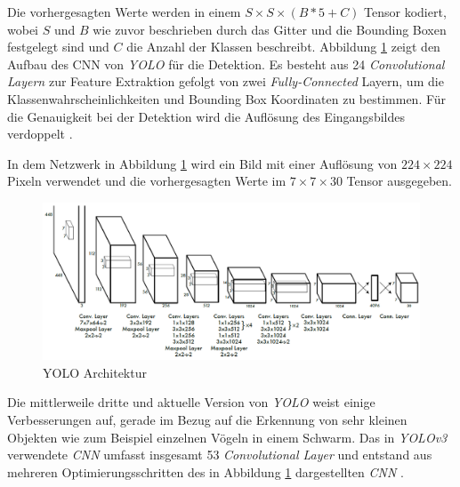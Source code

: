 Die vorhergesagten Werte werden in einem $S \times S \times (B * 5 + C)$ Tensor kodiert, wobei $S$ und $B$ wie zuvor beschrieben durch das Gitter und die Bounding Boxen festgelegt sind und $C$ die Anzahl der Klassen beschreibt. Abbildung \ref{yolo_architecture} zeigt den Aufbau des CNN von \textit{YOLO} für die Detektion. Es besteht aus 24 \textit{Convolutional Layern} zur Feature Extraktion gefolgt von zwei \textit{Fully-Connected} Layern, um die Klassenwahrscheinlichkeiten und Bounding Box Koordinaten zu bestimmen. Für die Genauigkeit bei der Detektion wird die Auflösung des Eingangsbildes verdoppelt \cite{JosephRedmon.2016}. 

In dem Netzwerk in Abbildung \ref{yolo_architecture} wird ein Bild mit einer Auflösung von $224 \times 224$ Pixeln verwendet und die vorhergesagten Werte im $7 \times 7 \times 30$ Tensor ausgegeben.

\begin{figure}[ht]
	\begin{center}
		\includegraphics[width=15cm]{Bilder/yolo_architecture.png} 
		\caption[YOLO Architektur]{YOLO Architektur \cite{JosephRedmon.2016}}
		\label{yolo_architecture}
	\end{center}
\end{figure}

Die mittlerweile dritte und aktuelle Version von \textit{YOLO} weist einige Verbesserungen auf, gerade im Bezug auf die Erkennung von sehr kleinen Objekten wie zum Beispiel einzelnen Vögeln in einem Schwarm. Das in \textit{YOLOv3} verwendete \textit{CNN} umfasst insgesamt 53 \textit{Convolutional Layer} und entstand aus mehreren Optimierungsschritten des in Abbildung \ref{yolo_architecture} dargestellten \textit{CNN} \cite{JosephRedmon.2018}. 





